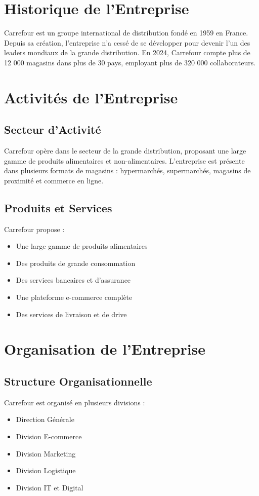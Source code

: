 \section{Historique de l'Entreprise}
Carrefour est un groupe international de distribution fondé en 1959 en France. Depuis sa création, l'entreprise n'a cessé de se développer pour devenir l'un des leaders mondiaux de la grande distribution. En 2024, Carrefour compte plus de 12 000 magasins dans plus de 30 pays, employant plus de 320 000 collaborateurs.

\section{Activités de l'Entreprise}
\subsection{Secteur d'Activité}
Carrefour opère dans le secteur de la grande distribution, proposant une large gamme de produits alimentaires et non-alimentaires. L'entreprise est présente dans plusieurs formats de magasins : hypermarchés, supermarchés, magasins de proximité et commerce en ligne.

\subsection{Produits et Services}
Carrefour propose :
\begin{itemize}
    \item Une large gamme de produits alimentaires
    \item Des produits de grande consommation
    \item Des services bancaires et d'assurance
    \item Une plateforme e-commerce complète
    \item Des services de livraison et de drive
\end{itemize}

\section{Organisation de l'Entreprise}
\subsection{Structure Organisationnelle}
Carrefour est organisé en plusieurs divisions :
\begin{itemize}
    \item Direction Générale
    \item Division E-commerce
    \item Division Marketing
    \item Division Logistique
    \item Division IT et Digital
\end{itemize}


